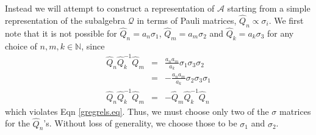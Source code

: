\documentclass[11pt]{article}
\newcommand{\hQ}{\hat Q}
\newcommand{\cA}{\mathcal A}
\newcommand{\cQ}{\mathcal Q}
\newcommand{\h}{\hat}
\begin{document}
Instead we will attempt to construct a representation of $\cA$
starting from a simple representation of the subalgebra $\cQ$ in terms
of Pauli matrices, $\hQ_n\propto \sigma_i$.
We first note that it is not possible for $\hQ_n=a_n\sigma_1$,
$\hQ_m=a_m\sigma_2$ and $\h Q_k=a_k \sigma_3$ for any choice of
$n,m,k\in\mathbb{N}$, since 
\begin{eqnarray}
\hQ_n\hQ_k^{-1}\hQ_m&=&\frac{a_na_m}{a_k}\sigma_1\sigma_3\sigma_2\nonumber\\
&=&-\frac{a_na_m}{a_k}\sigma_2\sigma_3\sigma_1\nonumber\\
\hQ_n\hQ_k^{-1}\hQ_m&=&-\hQ_m\hQ_k^{-1}\hQ_n
\end{eqnarray}
which violates Eqn \ref{gregrels.eq}. Thus, we must  choose only two
of the $\sigma$ matrices for the $\hQ_n$'s. Without loss of
generality, we choose those to be $\sigma_1$ and $\sigma_2$.
\end{document}
